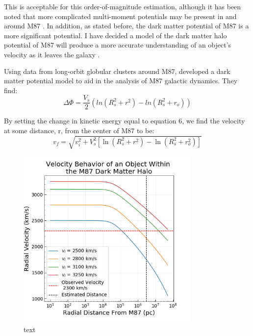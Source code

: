 \documentclass{aastex62}
\begin{document}
This is acceptable for this order-of-magnitude estimation, although it has been noted that more complicated multi-moment potentials may be present in and around M87 \citep{mur14}. In addition, as stated before, the dark matter potential of M87 is a more significant potential. I have decided a model of the dark matter halo potential of M87 will produce a more accurate understanding of an object's velocity as it leaves the galaxy \citep{zhu14}. 

Using data from long-orbit globular clusters around M87, \citet{zhu14} developed a dark matter potential model to aid in the analysis of M87 galactic dynamics. They find:
\begin{equation}
\Delta\Phi = \frac{V_{s}}{2}(ln(R_{s}^2 + r^2) - ln(R_{s}^2 + r_{o}))
\end{equation}

By setting the change in kinetic energy equal to equation 6, we find the velocity at some distance, r, from the center of M87 to be:
\begin{equation}
v_{f} = \sqrt{v_{i}^2 + V_{s}^{2}[\ln(R_{s}^2 + r^2) - \ln(R_{s}^2 + r_{o}^2)]}
\end{equation}

\begin{figure}
\includegraphics[width=9cm,height=9cm]{./Images/velocity_behavior.png}
\centering
\caption{text\label{fig1}}
\end{figure}
\end{document}
